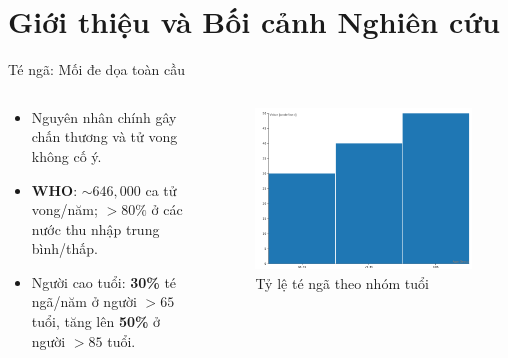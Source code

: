 
\section{Giới thiệu và Bối cảnh Nghiên cứu}

\begin{frame}{Té ngã: Mối đe dọa toàn cầu}
    \begin{columns}[T]
        \begin{column}{0.48\textwidth}
            \begin{itemize}
                \item Nguyên nhân chính gây chấn thương và tử vong không cố ý.
                \item \textbf{WHO}: $\sim646,000$ ca tử vong/năm; $>80\%$ ở các nước thu nhập trung bình/thấp.
                \item Người cao tuổi: \textbf{30\%} té ngã/năm ở người $>65$ tuổi, tăng lên \textbf{50\%} ở người $>85$ tuổi.
            \end{itemize}
        \end{column}
        \begin{column}{0.48\textwidth}
            \begin{figure}
                \centering
                \includegraphics[width=\textwidth]{images/fall_status_who.png}
                \caption{Tỷ lệ té ngã theo nhóm tuổi}
            \end{figure}
        \end{column}
    \end{columns}
\end{frame}

